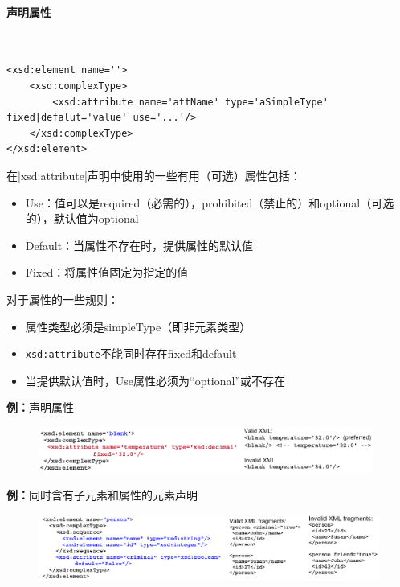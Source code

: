 \paragraph*{声明属性}~{} \par
\begin{lstlisting}
<xsd:element name=''>
	<xsd:complexType>
		<xsd:attribute name='attName' type='aSimpleType' fixed|defalut='value' use='...'/>
	</xsd:complexType>
</xsd:element>
\end{lstlisting}
在\sverb|xsd:attribute|\;声明中使用的一些有用（可选）属性包括：
\begin{itemize}
	\item Use：值可以是required（必需的），prohibited（禁止的）和optional（可选的），默认值为optional
	\item Default：当属性不存在时，提供属性的默认值
	\item Fixed：将属性值固定为指定的值
\end{itemize}

对于属性的一些规则：
\vspace{-0.8em}
\begin{multicols}{2}
	\begin{itemize}
		\item 属性类型必须是simpleType（即非元素类型）
		\item \verb|xsd:attribute|\;不能同时存在fixed和default
		\item 当提供默认值时，Use属性必须为“optional”或不存在
	\end{itemize}
\end{multicols}
\vspace{-1em}

\textbf{例：}声明属性
\begin{figure}[H]
    \vspace{-0.5em}
	\centering
	\includegraphics[width=0.98\textwidth]{images/声明属性}
    \vspace{-1em}
\end{figure}

\textbf{例：}同时含有子元素和属性的元素声明
\begin{figure}[H]
    \vspace{-0.5em}
	\centering
	\includegraphics[width=\textwidth]{images/同时含有子元素和属性的元素声明}
    \vspace{-2em}
\end{figure}

